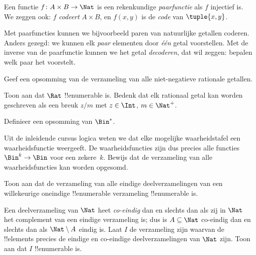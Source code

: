 \documentclass[openany]{memoir}
\begin{document}
\begin{defn}[Paarfunctie]
  Een functie $f\colon A \times B \to \Nat$ is een rekenkundige
  \emph{paarfunctie} als $f$ injectief is. We zeggen ook: $f$
  \emph{codeert} $A \times B$, en $f(x,y)$ is de
  \emph{code} van $\tuple{x,y}$.
\end{defn}

\begin{explain}
Met paarfuncties kunnen we bijvoorbeeld paren van natuurlijke getallen
coderen. Anders gezegd: we kunnen elk \emph{paar} elementen door
\emph{één} getal voorstellen. Met de inverse van de paarfunctie
kunnen we het getal \emph{decoderen}, dat wil zeggen: bepalen welk paar
het voorstelt.
\end{explain}

\begin{prob}
Geef een opsomming van de verzameling van alle niet-negatieve rationale
getallen.
\end{prob}

\begin{prob}
Toon aan dat $\Rat$ !!{enumerable} is. Bedenk dat elk rationaal getal
kan worden geschreven als een breuk $z/m$ met $z \in \Int$, $m \in \Nat^+$.
\end{prob}

\begin{prob}
Definieer een opsomming van $\Bin^*$.
\end{prob}

\begin{prob}
Uit de inleidende cursus logica weten we dat elke mogelijke waarheidstafel een
waarheidsfunctie weergeeft. De waarheidsfuncties zijn dus precies alle functies
$\Bin^k \to \Bin$ voor een zekere~$k$. Bewijs dat de verzameling van alle
waarheidsfuncties kan worden opgesomd.
\end{prob}

\begin{prob}
Toon aan dat de verzameling van alle eindige deelverzamelingen van een
willekeurige oneindige !!{enumerable} verzameling !!{enumerable} is.
\end{prob}

\begin{prob}
Een deelverzameling van $\Nat$ heet \emph{co-eindig} dan en slechts dan
als zij in $\Nat$ het complement van een eindige verzameling is; dus
is $A \subseteq \Nat$ co-eindig dan en slechts dan als
$\Nat\setminus A$ eindig is. Laat $I$ de verzameling zijn waarvan de
!!{element}s precies de eindige en co-eindige deelverzamelingen van
$\Nat$ zijn. Toon aan dat $I$ !!{enumerable} is.
\end{prob}
\end{document}
